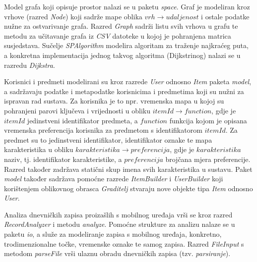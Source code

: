 \documentclass[times, utf8, diplomski, numeric]{fer}
\begin{document}
Model grafa koji opisuje prostor nalazi se u paketu \emph{space}. Graf je
modeliran kroz vrhove (razred \emph{Node}) koji sadrže mape oblika
$vrh \rightarrow udaljenost$ i ostale podatke nužne za ostvarivanje grafa.
Razred \emph{Graph} sadrži listu svih vrhova u grafu te metodu za učitavanje
grafa iz \emph{CSV} datoteke u kojoj je pohranjena matrica susjedstava. Sučelje
\emph{SPAlgorithm} modelira algoritam za traženje najkraćeg puta, a konkretna
implementacija jednog takvog algoritma (Dijkstrinog) nalazi se u razredu
\emph{Dijkstra}.

Korisnici i predmeti modelirani su kroz razrede \emph{User} odnosno \emph{Item}
paketa \emph{model}, a sadržavaju podatke i metapodatke korisnicima i predmetima
koji su nužni za ispravan rad sustava. Za korisnika je to npr. vremenska mapa u
kojoj su pohranjeni parovi ključeva i vrijednosti u obliku
$itemId \rightarrow function$, gdje je $itemId$ jedinstveni identifikator
predmeta, a $function$ funkcija kojom je opisana vremenska preferencija
korisnika za predmetom s identifikatorom $itemId$. Za predmet su to jedinstveni
identifikator, identifikator oznake te mapa karakteristika u obliku
$karakteristika \rightarrow preferencija$, gdje je $karakteristika$ naziv, tj.
identifikator karakteristike, a $preferencija$ brojčana mjera preferencije.
Razred također zadržava statični skup imena svih karakteristika u sustavu.
Paket \emph{model} također sadržava pomoćne razrede \emph{ItemBuilder} i
\emph{UserBuilder} koji korištenjem oblikovnog obrasca \emph{Graditelj} stvaraju
nove objekte tipa \emph{Item} odnosno \emph{User}.
 
Analiza dnevničkih zapisa proizašlih s mobilnog uređaja vrši se kroz razred
\emph{RecordAnalyzer} i metodu \emph{analyze}. Pomoćne strukture za analizu
nalaze se u paketu \emph{io}, a služe za modeliranje zapisa s mobilnog uređaja,
konkretno, trodimenzionalne točke, vremenske oznake te samog zapisa. Razred
\emph{FileInput} s metodom \emph{parseFile} vrši ulaznu obradu dnevničkih
zapisa (tzv. \emph{parsiranje}).
\end{document}

